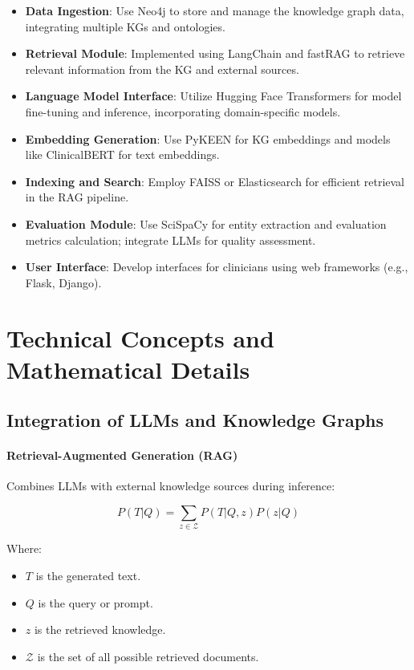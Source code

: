 \documentclass[12pt, a4paper]{article}
\begin{document}
\begin{itemize}
    \item \textbf{Data Ingestion}: Use Neo4j to store and manage the knowledge graph data, integrating multiple KGs and ontologies.
    \item \textbf{Retrieval Module}: Implemented using LangChain and fastRAG to retrieve relevant information from the KG and external sources.
    \item \textbf{Language Model Interface}: Utilize Hugging Face Transformers for model fine-tuning and inference, incorporating domain-specific models.
    \item \textbf{Embedding Generation}: Use PyKEEN for KG embeddings and models like ClinicalBERT for text embeddings.
    \item \textbf{Indexing and Search}: Employ FAISS or Elasticsearch for efficient retrieval in the RAG pipeline.
    \item \textbf{Evaluation Module}: Use SciSpaCy for entity extraction and evaluation metrics calculation; integrate LLMs for quality assessment.
    \item \textbf{User Interface}: Develop interfaces for clinicians using web frameworks (e.g., Flask, Django).
\end{itemize}

\section{Technical Concepts and Mathematical Details}

\subsection{Integration of LLMs and Knowledge Graphs}

\paragraph{Retrieval-Augmented Generation (RAG)}

Combines LLMs with external knowledge sources during inference:

\begin{equation}
P(T|Q) = \sum_{z \in \mathcal{Z}} P(T|Q, z) P(z|Q)
\end{equation}

Where:

\begin{itemize}
    \item \( T \) is the generated text.
    \item \( Q \) is the query or prompt.
    \item \( z \) is the retrieved knowledge.
    \item \( \mathcal{Z} \) is the set of all possible retrieved documents.
\end{itemize}
\end{document}
